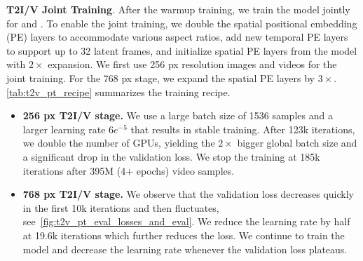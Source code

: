 \noindent \textbf{T2I/V Joint Training}.
After the \textToIShort warmup training, we train the model jointly for \textToI and \textToV.
To enable the joint training, we double the spatial positional embedding (PE) layers to accommodate various aspect ratios,
add new temporal PE layers to support up to 32 latent frames,
and initialize spatial PE layers from the \textToIShort model with $2\times$ expansion.
We first use 256 px resolution images and videos for the \textToIVShort joint training.
For the 768 px stage, we expand the spatial PE layers by $3\times$.
\cref{tab:t2v_pt_recipe} summarizes the training recipe.
\begin{itemize}
    \item \textbf{256 px T2I/V stage.}
    We use a large batch size of 1536 samples and a larger learning rate $6e^{-5}$ that results in stable training.
    After 123k iterations, we double the number of GPUs, yielding the $2 \times$ bigger global batch size and a significant drop in the validation loss.
    We stop the training at 185k iterations after 395M (4+ epochs) video samples.
    \item \textbf{768 px T2I/V stage.}
    We observe that the validation loss decreases quickly in the first 10k iterations and then fluctuates, see~\cref{fig:t2v_pt_eval_losses_and_eval}.
    We reduce the learning rate by half at 19.6k iterations which further reduces the loss.
    We continue to train the model and decrease the learning rate whenever the validation loss plateaus.
\end{itemize}







